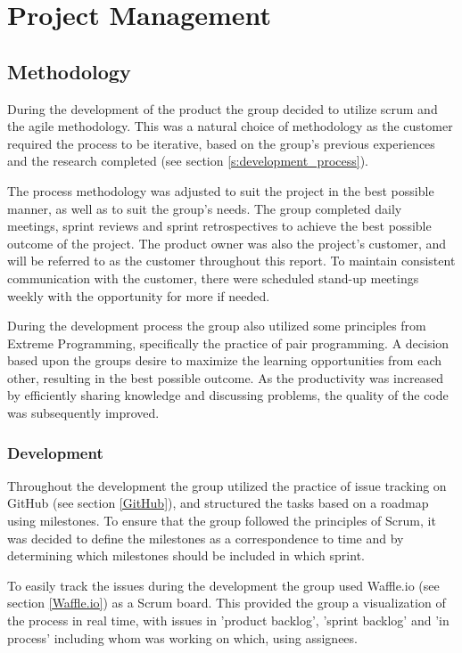
\chapter{Project Management}

\section{Methodology}
\label{methodology}
During the development of the product the group decided to utilize scrum and the agile methodology. This was a natural choice of methodology as the customer required the process to be iterative, based on the group's previous experiences and the research completed (see section \ref{s:development_process}). 

The process methodology was adjusted to suit the project in the best possible manner, as well as to suit the group's needs. The group completed daily meetings, sprint reviews and sprint retrospectives to achieve the best possible outcome of the project. The product owner was also the project's customer, and will be referred to as the customer throughout this report. To maintain consistent communication with the customer, there were scheduled stand-up meetings weekly with the opportunity for more if needed. 

During the development process the group also utilized some principles from Extreme Programming, specifically the practice of pair programming. A decision based upon the groups desire to maximize the learning opportunities from each other, resulting in the best possible outcome. As the productivity was increased by efficiently sharing knowledge and discussing problems, the quality of the code was subsequently improved.  

\subsection{Development}
Throughout the development the group utilized the practice of issue tracking on GitHub (see section \ref{GitHub}), and structured the tasks based on a roadmap using milestones. 
To ensure that the group followed the principles of Scrum, it was decided to define the milestones as a correspondence to time and by determining which milestones should be included in which sprint. 

To easily track the issues during the development the group used Waffle.io (see section \ref{Waffle.io}) as a Scrum board. This provided the group a visualization of the process in real time, with issues in 'product backlog', 'sprint backlog' and 'in process' including whom was working on which, using assignees. 


